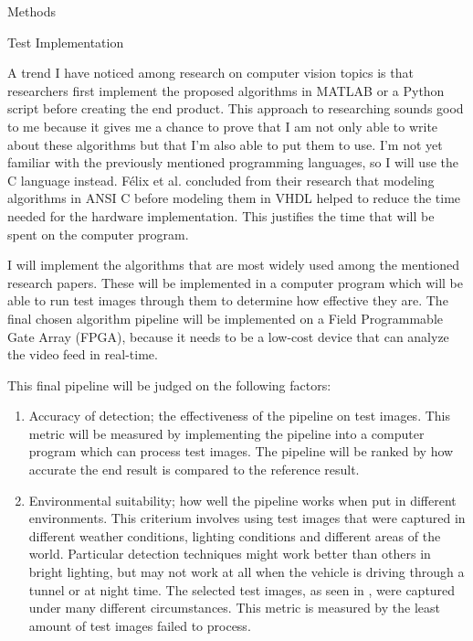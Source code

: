 \documentclass{matthijs}
\begin{document}
	\begin{hoofdstuk}{Methods}

		\begin{paragraaf}{Test Implementation}

			A trend I have noticed among research on computer vision topics is that researchers first implement the proposed algorithms in MATLAB or a Python script before creating the end product.
			This approach to researching sounds good to me because it gives me a chance to prove that I am not only able to write about these algorithms but that I'm also able to put them to use.
			I'm not yet familiar with the previously mentioned programming languages, so I will use the C language instead.
			F\'elix et al. \cite{felix2003low} concluded from their research that modeling algorithms in ANSI C before modeling them in VHDL helped to reduce the time needed for the hardware implementation.
			This justifies the time that will be spent on the computer program.

			I will implement the algorithms that are most widely used among the mentioned research papers.
			These will be implemented in a computer program which will be able to run test images through them to determine how effective they are.
			The final chosen algorithm pipeline will be implemented on a Field Programmable Gate Array (FPGA), because it needs to be a low-cost device that can analyze the video feed in real-time.

			This final pipeline will be judged on the following factors:

			\begin{enumerate}

				\item	Accuracy of detection; the effectiveness of the pipeline on test images.
					This metric will be measured by implementing the pipeline into a computer program which can process test images.
					The pipeline will be ranked by how accurate the end result is compared to the reference result.

				\item	Environmental suitability; how well the pipeline works when put in different environments.
					This criterium involves using test images that were captured in different weather conditions, lighting conditions and different areas of the world.
					Particular detection techniques might work better than others in bright lighting, but may not work at all when the vehicle is driving through a tunnel or at night time.
					The selected test images, as seen in , were captured under many different circumstances.
					This metric is measured by the least amount of test images failed to process.


\end{enumerate}
\end{paragraaf}
\end{hoofdstuk}
\end{document}

